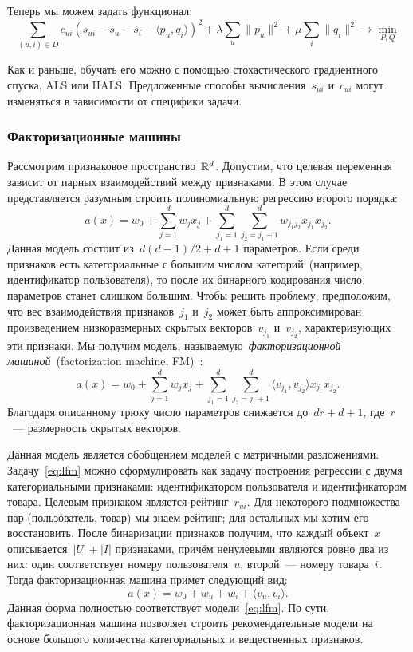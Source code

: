 \documentclass[12pt,fleqn]{article}
\begin{document}
Теперь мы можем задать функционал:
\[
    \sum_{(u, i) \in D}
        c_{ui} \left(
            s_{ui}
            -
            \bar s_u
            -
            \bar s_i
            -
            \langle p_{u}, q_{i} \rangle
        \right)^{2}
    +
    \lambda
    \sum_{u}
        \|p_u\|^2
    +
    \mu
    \sum_{i}
        \|q_i\|^2
    \to
    \min_{P, Q}
\]

Как и раньше, обучать его можно с помощью стохастического градиентного спуска, ALS или HALS.
Предложенные способы вычисления~$s_{ui}$ и~$c_{ui}$ могут изменяться в зависимости от специфики задачи.

\subsubsection{Факторизационные машины}
Рассмотрим признаковое пространство~$\mathbb{R}^d$.
Допустим, что целевая переменная зависит от парных
взаимодействий между признаками.
В этом случае представляется разумным строить
полиномиальную регрессию второго порядка:
\[
    a(x)
    =
    w_0
    +
    \sum_{j = 1}^{d}
        w_j x_j
    +
    \sum_{j_1 = 1}^{d}
    \sum_{j_2 = j_1 + 1}^{d}
        w_{j_1 j_2}
        x_{j_1} x_{j_2}.
\]
Данная модель состоит из~$d (d - 1) / 2 + d + 1$ параметров.
Если среди признаков есть категориальные с большим числом категорий~(например,
идентификатор пользователя), то после их бинарного кодирования число параметров
станет слишком большим.
Чтобы решить проблему, предположим, что вес
взаимодействия признаков~$j_1$ и~$j_2$ может быть
аппроксимирован произведением низкоразмерных скрытых векторов~$v_{j_1}$ и~$v_{j_2}$,
характеризующих эти признаки.
Мы получим модель, называемую~\emph{факторизационной машиной}~(factorization machine, FM)~\cite{rendle12fm}:
\[
    a(x)
    =
    w_0
    +
    \sum_{j = 1}^{d}
        w_j x_j
    +
    \sum_{j_1 = 1}^{d}
    \sum_{j_2 = j_1 + 1}^{d}
        \langle v_{j_1}, v_{j_2} \rangle
        x_{j_1} x_{j_2}.
\]
Благодаря описанному трюку число параметров снижается до~$dr + d + 1$,
где~$r$~--- размерность скрытых векторов.

Данная модель является обобщением моделей с матричными разложениями.
Задачу~\eqref{eq:lfm} можно сформулировать как задачу построения регрессии
с двумя категориальными признаками: идентификатором пользователя
и идентификатором товара.
Целевым признаком является рейтинг~$r_{ui}$.
Для некоторого подмножества пар (пользователь, товар)
мы знаем рейтинг; для остальных мы хотим его восстановить.
После бинаризации признаков получим, что каждый объект~$x$ описывается~$|U| + |I|$
признаками, причём ненулевыми являются ровно два из них: один соответствует
номеру пользователя~$u$, второй~--- номеру товара~$i$.
Тогда факторизационная машина примет следующий вид:
\[
    a(x)
    =
    w_0
    +
    w_{u}
    +
    w_{i}
    +
    \langle v_u, v_i \rangle.
\]
Данная форма полностью соответствует модели~\eqref{eq:lfm}.
По сути, факторизационная машина позволяет строить рекомендательные модели
на основе большого количества категориальных и вещественных признаков.
\end{document}
